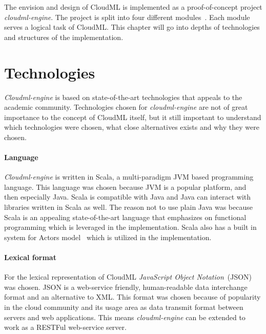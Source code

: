 




The envision and design of CloudML is implemented as a proof-of-concept project \emph{cloudml-engine}.
The project is split into four different modules~. 
Each module serves a logical task of CloudML.
This chapter will go into depths of technologies and structures of the implementation.

\section{Technologies}

\emph{Cloudml-engine} is based on state-of-the-art technologies that appeals to the academic community.
Technologies chosen for \emph{cloudml-engine} are not of great importance to the concept of CloudML itself,
but it still important to understand which technologies were chosen, what close alternatives exists
and why they were chosen.

\paragraph{Language} 
\emph{Cloudml-engine} is written in Scala, a multi-paradigm JVM based programming language.
This language was chosen because JVM is a popular platform, and then especially Java.
Scala is compatible with Java and Java can interact with libraries written in Scala as well.
The reason not to use plain Java was because Scala is an appealing state-of-the-art language that emphasizes 
on functional programming which is leveraged in the implementation.
Scala also has a built in system for Actors model~\cite{actors:haller07} which is utilized in the implementation.

\paragraph{Lexical format}
For the lexical representation of CloudML \emph{JavaScript Object Notation}~(JSON) was chosen.
JSON is a web-service friendly, human-readable data interchange format and an alternative to XML.
This format was chosen because of popularity in the cloud community 
and its usage area as data transmit format between servers and web applications.
This means \emph{cloudml-engine} can be extended to work as a RESTFul web-service server.

